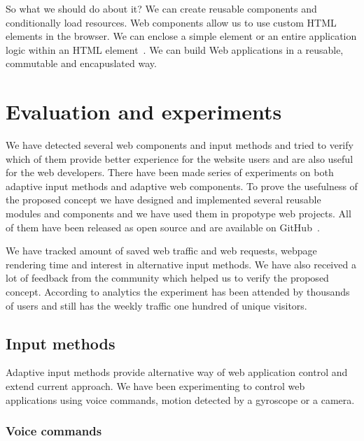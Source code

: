 \documentclass{iitsrc}
\begin{document}
So what we should do about it? We can create reusable components and conditionally load resources. Web components allow us to use custom HTML elements in the browser. We can enclose a simple element or an entire application logic within an HTML element~\cite{webcomponents}. We can build Web applications in a reusable, commutable and encapuslated way.


\section{Evaluation and experiments} %
\label{sec:evaluation_and_experiments}

We have detected several web components and input methods and tried to verify which of them provide better experience for the website users and are also useful for the web developers. There have been made series of experiments on both adaptive input methods and adaptive web components. To prove the usefulness of the proposed concept we have designed and implemented several reusable modules and components and we have used them in propotype web projects. All of them have been released as open source and are available on GitHub~\footnotemark.


We have tracked amount of saved web traffic and web requests, webpage rendering time and interest in alternative input methods. We have also received a lot of feedback from the community which helped us to verify the proposed concept. According to analytics the experiment has been attended by thousands of users and still has the weekly traffic one hundred of unique visitors.

\subsection{Input methods} %
\label{sub:input_methods}

Adaptive input methods provide alternative way of web application control and extend current approach. We have been experimenting to control web applications using voice commands, motion detected by a gyroscope or a camera.

\subsubsection*{Voice commands} %
\label{ssub:voice_commands}
\end{document}
